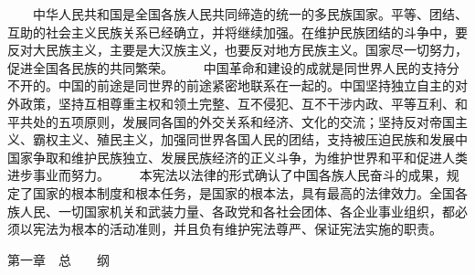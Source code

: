  　　中华人民共和国是全国各族人民共同缔造的统一的多民族国家。平等、团结、互助的社会主义民族关系已经确立，并将继续加强。在维护民族团结的斗争中，要反对大民族主义，主要是大汉族主义，也要反对地方民族主义。国家尽一切努力，促进全国各民族的共同繁荣。
 　　中国革命和建设的成就是同世界人民的支持分不开的。中国的前途是同世界的前途紧密地联系在一起的。中国坚持独立自主的对外政策，坚持互相尊重主权和领土完整、互不侵犯、互不干涉内政、平等互利、和平共处的五项原则，发展同各国的外交关系和经济、文化的交流；坚持反对帝国主义、霸权主义、殖民主义，加强同世界各国人民的团结，支持被压迫民族和发展中国家争取和维护民族独立、发展民族经济的正义斗争，为维护世界和平和促进人类进步事业而努力。
 　　本宪法以法律的形式确认了中国各族人民奋斗的成果，规定了国家的根本制度和根本任务，是国家的根本法，具有最高的法律效力。全国各族人民、一切国家机关和武装力量、各政党和各社会团体、各企业事业组织，都必须以宪法为根本的活动准则，并且负有维护宪法尊严、保证宪法实施的职责。
     
第一章　总　　纲
     

